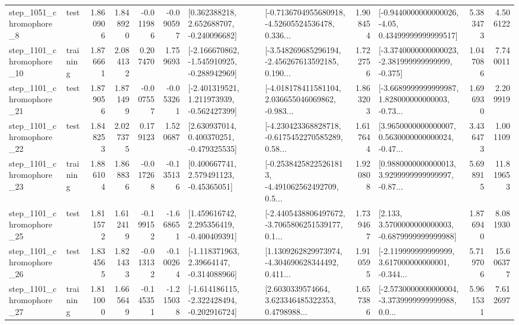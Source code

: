 \begin{tabular}{llrrrrllrlrr}
  step\_1051\_chromophore\_8 &      test &      1.860906 &    1.848920 &     -0.011986 & -0.090597 &    [0.362388218, 2.652688707, -0.240096682] &  [-0.7136704955680918, -4.52605524536478, 0.336... &       1.908454 &  [-0.9440000000000026, -4.05, 0.43499999999999517] &            5.383473 &          4.506122 \\
 step\_1101\_chromophore\_10 &  training &      1.876661 &    2.084132 &      0.207470 &  1.759693 &  [-2.166670862, -1.545910925, -0.288942969] &  [-3.548269685296194, -2.456267613592185, 0.190... &       1.722756 &  [-3.3740000000000023, -2.381999999999999, -0.375] &            1.047086 &          7.740011 \\
 step\_1101\_chromophore\_21 &      test &      1.879056 &    1.871499 &     -0.007557 & -0.053261 &   [-2.401319521, 1.211973939, -0.562427399] &  [-4.018178411581104, 2.036655046069862, -0.983... &       1.863203 &  [-3.6689999999999987, 1.828000000000003, -0.73... &            1.696930 &          2.209919 \\
 step\_1101\_chromophore\_22 &      test &      1.848253 &    2.027375 &      0.179123 &  1.520687 &    [2.630937014, 0.400370251, -0.479325535] &  [-4.230423368828718, -0.6175452270585289, 0.58... &       1.617644 &  [3.9650000000000007, 0.5630000000000024, -0.47... &            3.436473 &          1.001109 \\
 step\_1101\_chromophore\_23 &  training &      1.886104 &    1.868836 &     -0.017268 & -0.135136 &     [0.400667741, 2.579491123, -0.45365051] &  [-0.25384258225261813, -4.491062562492709, 0.5... &       1.920808 &  [0.9880000000000013, 3.9299999999999997, -0.87... &            5.698915 &         11.819653 \\
 step\_1101\_chromophore\_25 &      test &      1.811572 &    1.612419 &     -0.199152 & -1.668651 &    [1.459616742, 2.295356419, -0.400409391] &  [-2.4405438806497672, -3.7065806251539177, 0.1... &       1.739467 &   [2.133, 3.5700000000000003, -0.6879999999999988] &            1.876940 &          8.081930 \\
 step\_1101\_chromophore\_26 &      test &      1.834565 &    1.821433 &     -0.013132 & -0.100264 &    [-1.118371963, 2.39664147, -0.314088966] &  [1.1309262829973974, -4.304690628344492, 0.411... &       1.910595 &  [-2.119999999999999, 3.617000000000001, -0.344... &            5.719706 &         15.606377 \\
 step\_1101\_chromophore\_27 &  training &      1.811000 &    1.665649 &     -0.145351 & -1.215038 &  [-1.614186115, -2.322428494, -0.202916724] &  [2.6030339574664, 3.623346485322353, 0.4798988... &       1.657386 &  [-2.5730000000000004, -3.3739999999999988, 0.0... &            5.961531 &          7.612697 \\

\end{tabular}
